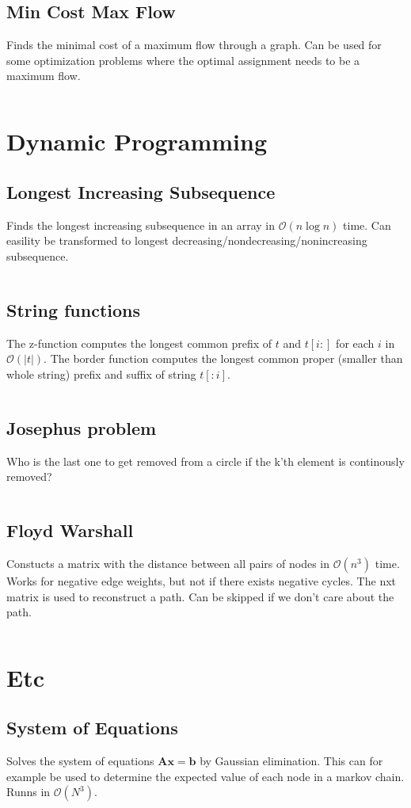 \documentclass[8pt,a4paper,landscape,oneside]{amsart}
\newcommand{\codej}[1]{\inputminted[fontsize=\large,tabsize=2,baselinestretch=1]{java}{code/#1}}
\newcommand{\codep}[1]{\inputminted[fontsize=\large,tabsize=2,baselinestretch=1]{py}{code/#1}}
\newcommand{\bigO}{\mathcal{O}}
\begin{document}
\begin{multicols*}{2}
\begin{large}
    \subsection{Min Cost Max Flow}
        Finds the minimal cost of a maximum flow through a graph. 
        Can be used for some optimization problems where the optimal assignment needs to be a maximum flow.
        \codej{Graphs/MinCostMaxFlow.java}

\section{Dynamic Programming}
    \subsection{Longest Increasing Subsequence}
        Finds the longest increasing subsequence in an array in $\bigO(n \log{n})$ time. Can easility be transformed to longest decreasing/nondecreasing/nonincreasing subsequence.
        \codej{DP/lis.py}
    \subsection{String functions}
        The z-function computes the longest common prefix of $t$ and $t[i:]$ for each $i$ in $\bigO(|t|)$.
        The border function computes the longest common proper (smaller than whole string) prefix and suffix of string $t[:i]$.
        \codep{DP/strings.py}
    \subsection{Josephus problem}
        Who is the last one to get removed from a circle if the k'th element is continously removed?
        \codep{DP/josephus.py}
    \subsection{Floyd Warshall}
        Constucts a matrix with the distance between all pairs of nodes in $\bigO(n^3)$ time.
        Works for negative edge weights, but not if there exists negative cycles.
        The nxt matrix is used to reconstruct a path. Can be skipped if we don't care about the path.
        \codep{DP/floydwarshall.py}

\section{Etc}
    \subsection{System of Equations}
        Solves the system of equations $\bm{A}\bm{x} = \bm{b}$ by Gaussian elimination. This can for example be used to determine the expected value of each node in a markov chain. Runns in $\bigO (N^3)$.
        \codep{Etc/gauss.py}

\end{large}
\end{multicols*}
\end{document}

